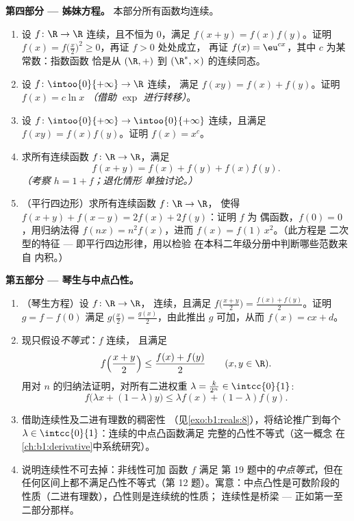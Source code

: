 \begin{problem}[{周末问题 --- $f(x + y) = f(x) + f(y)$：
正则性导出线性，以及“怪物”的画像}]
\medskip
\noindent\textbf{第四部分 --- 姊妹方程。}
本部分所有函数均连续。
\begin{enumerate}[resume]
  \item 设 $f \colon \R \to \R$ 连续，且不恒为
        $0$，满足 $f(x + y) = f(x)f(y)$。证明 $f(x) =
        f\bigl(\frac x2\bigr)^2 \geq 0$，再证 $f > 0$ 处处成立，
        再证 $f(x) = \eu^{cx}$，其中 $c$ 为某常数：指数函数
        恰是从 $(\R, +)$ 到
        $(\R^*, \times)$ 的连续同态。
  \item 设 $f \colon \intoo{0}{+\infty} \to \R$ 连续，
        满足 $f(xy) = f(x) + f(y)$。证明 $f(x) = c\ln x$
        \emph{（借助 $\exp$ 进行转移）}。
  \item 设 $f \colon \intoo{0}{+\infty} \to \intoo{0}{+\infty}$
        连续，且满足 $f(xy) = f(x)f(y)$。证明 $f(x) = x^c$。
  \item 求所有连续函数 $f \colon \R \to \R$，满足
        \[
        f(x + y) = f(x) + f(y) + f(x)f(y) .
        \]
        \emph{（考察 $h = 1 + f$；退化情形
        单独讨论。）}
  \item （平行四边形）求所有连续函数 $f \colon \R \to \R$，
        使得 $f(x + y) + f(x - y) = 2f(x) + 2f(y)$：证明 $f$ 为
        偶函数，$f(0) = 0$，用归纳法得 $f(nx) = n^2 f(x)$，进而
        $f(x) = f(1)\,x^2$。（此方程是
        二次型的特征 --- 即平行四边形律，用以检验
        在本科二年级分册中判断哪些范数来自
        内积。）
\end{enumerate}

\medskip
\noindent\textbf{第五部分 --- 琴生与中点凸性。}
\begin{enumerate}[resume]
  \item （琴生方程）设 $f \colon \R \to \R$，
        连续，且满足 $f\bigl(\frac{x+y}{2}\bigr) = \frac{f(x)
        + f(y)}{2}$。证明 $g = f - f(0)$ 满足
        $g\bigl(\frac x2\bigr) = \frac{g(x)}{2}$，由此推出
        $g$ 可加，从而 $f(x) = cx + d$。
  \item 现只假设\emph{不等式}：$f$ 连续，
        且满足
        \[
        f\Bigl(\frac{x + y}{2}\Bigr) \leq \frac{f(x) +
        f(y)}{2} \qquad (x, y \in \R).
        \]
        用对 $n$ 的归纳法证明，对所有二进权重
        $\lambda = \frac{k}{2^n} \in \intcc{0}{1}$:
        \[
        f\bigl(\lambda x + (1 - \lambda)y\bigr) \leq \lambda
        f(x) + (1 - \lambda) f(y) .
        \]
  \item 借助连续性及二进有理数的稠密性
        （见\cref{exo:b1:reals:8}），将结论推广到每个 $\lambda \in
        \intcc{0}{1}$：连续的中点凸函数满足
        完整的凸性不等式（这一概念
        在\cref{ch:b1:derivative}中系统研究）。
  \item 说明连续性不可去掉：非线性可加
        函数 $f$ 满足
        第 19 题中的\emph{中点等式}，但在任何区间上都不满足凸性不等式（第
        12 题）。寓意：中点凸性是可数阶段的
        性质（二进有理数），凸性则是连续统的性质；
        连续性是桥梁 --- 正如第一至二部分那样。
\end{enumerate}


\end{problem}
